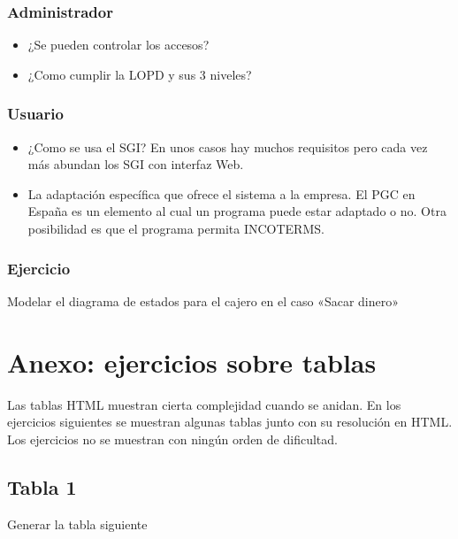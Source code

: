 \documentclass[letterpaper,10pt,spanish]{sphinxmanual}
\begin{document}
\subsection{Administrador}
\label{\detokenize{tema8:administrador}}\begin{itemize}
\item {} 
¿Se pueden controlar  los accesos?

\item {} 
¿Como cumplir la LOPD y sus 3 niveles?

\end{itemize}


\subsection{Usuario}
\label{\detokenize{tema8:usuario}}\begin{itemize}
\item {} 
¿Como se usa el SGI? En unos casos hay muchos requisitos pero cada vez más abundan los SGI con interfaz Web.

\item {} 
La adaptación específica que ofrece el sistema a la empresa. El PGC en España es un elemento al cual un programa puede estar adaptado o no. Otra posibilidad es que el programa permita INCOTERMS.

\end{itemize}


\subsection{Ejercicio}
\label{\detokenize{tema8:ejercicio}}
Modelar el diagrama de estados para el cajero en el caso «Sacar dinero»


\chapter{Anexo: ejercicios sobre tablas}
\label{\detokenize{ejercicios/html/anexo_tablas::doc}}\label{\detokenize{ejercicios/html/anexo_tablas:anexo-ejercicios-sobre-tablas}}
Las tablas HTML muestran cierta complejidad cuando se anidan. En los ejercicios
siguientes se muestran algunas tablas junto con su resolución en HTML. Los
ejercicios no se muestran con ningún orden de dificultad.


\section{Tabla 1}
\label{\detokenize{ejercicios/html/anexo_tablas:tabla-1}}
Generar la tabla siguiente
\end{document}
